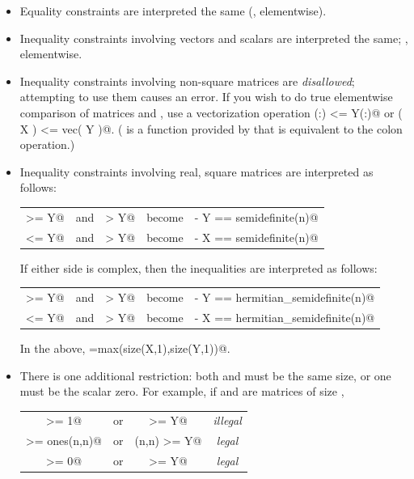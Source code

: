 \documentclass[12pt]{article}
\begin{document}
\begin{itemize}
\item Equality constraints are interpreted the same (\ie, elementwise).
\item Inequality constraints involving vectors and scalars are interpreted
      the same; \ie, elementwise.
\item Inequality constraints involving non-square matrices are \emph{disallowed};
      attempting to use them causes an error. If you wish to do true elementwise
      comparison of matrices \verb@X@ and \verb@Y@, use a vectorization
      operation \verb@X(:) <= Y(:)@ or \verb@vec( X ) <= vec( Y )@. (\verb@vec@
      is a function provided by \cvx that is equivalent to the colon operation.)
\item Inequality constraints involving real, square matrices are interpreted as follows:
	\begin{center}
	\begin{tabular}{ccccc}
	\verb@X >= Y@ & and & \verb@X > Y@ & become & \verb@X - Y == semidefinite(n)@ \\
	\verb@X <= Y@ & and & \verb@X > Y@  & become & \verb@Y - X == semidefinite(n)@
	\end{tabular}
	\end{center}
      If either side is complex, then the inequalities are
      interpreted as follows:
	\begin{center}
	\begin{tabular}{ccccc}
	\verb@X >= Y@ & and & \verb@X > Y@ & become & \verb@X - Y == hermitian_semidefinite(n)@ \\
	\verb@X <= Y@ & and & \verb@X > Y@  & become & \verb@Y - X == hermitian_semidefinite(n)@
	\end{tabular}
	\end{center}
      In the above, \verb@n=max(size(X,1),size(Y,1))@.
\item There is one additional restriction: both
      \verb@X@ and \verb@Y@ must be the same size, or one must
      be the scalar zero. For example, if \verb@X@ and \verb@Y@ are
      matrices of size \verb@n@,
      \begin{center}
      \begin{tabular}{cccc}
      	\verb@X >= 1@ & or & \verb@1 >= Y@ & \emph{illegal} \\
      	\verb@X >= ones(n,n)@ & or & \verb@ones(n,n) >= Y@ & \emph{legal} \\
      	\verb@X >= 0@ & or & \verb@0 >= Y@ & \emph{legal} \\

\end{tabular}
\end{center}
\end{itemize}
\end{document}
